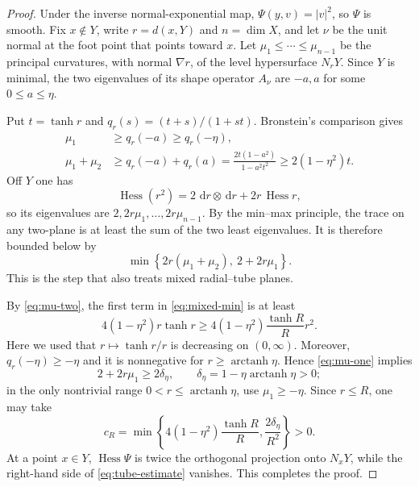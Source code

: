 \documentclass[12pt]{amsart}
\theoremstyle{remark}
\newcommand{\Hess}{\operatorname{Hess}}
\newcommand{\dd}{\,\mathrm d}
\begin{document}
\begin{proof}
Under the inverse normal-exponential map, $\Psi(y,v)=|v|^2$, so $\Psi$ is
smooth.  Fix $x\notin Y$, write $r=d(x,Y)$ and $n=\dim X$, and let $\nu$ be
the unit normal at the foot point that points toward $x$.  Let
$\mu_1\le\cdots\le\mu_{n-1}$ be the principal curvatures, with normal
$\nabla r$, of the level hypersurface $N_rY$.  Since $Y$ is minimal, the two
eigenvalues of its shape operator $A_\nu$ are $-a,a$ for some
$0\le a\le\eta$.

Put $t=\tanh r$ and $q_r(s)=(t+s)/(1+st)$.  Bronstein's comparison
\cite[Corollary~3.7]{BronsteinHadamard} gives
\begin{align}
 \mu_1&\ge q_r(-a)\ge q_r(-\eta),\label{eq:mu-one}\\
 \mu_1+\mu_2
 &\ge q_r(-a)+q_r(a)
 =\frac{2t(1-a^2)}{1-a^2t^2}
 \ge 2(1-\eta^2)t.\label{eq:mu-two}
\end{align}
Off $Y$ one has
\begin{equation}\label{eq:hessian-distance}
 \Hess(r^2)=2\,\dd r\otimes\dd r+2r\,\Hess r,
\end{equation}
so its eigenvalues are $2,2r\mu_1,\ldots,2r\mu_{n-1}$.  By the min--max
principle, the trace on any two-plane is at least the sum of the two least
eigenvalues.  It is therefore bounded below by
\begin{equation}\label{eq:mixed-min}
 \min\left\{2r(\mu_1+\mu_2),\ 2+2r\mu_1\right\}.
\end{equation}
This is the step that also treats mixed radial--tube planes.

By \eqref{eq:mu-two}, the first term in \eqref{eq:mixed-min} is at least
\[
 4(1-\eta^2)r\tanh r
 \ge 4(1-\eta^2)\frac{\tanh R}{R}r^2.
\]
Here we used that $r\mapsto\tanh r/r$ is decreasing on $(0,\infty)$.
Moreover, $q_r(-\eta)\ge-\eta$ and it is nonnegative for
$r\ge\operatorname{arctanh}\eta$.  Hence \eqref{eq:mu-one} implies
\[
 2+2r\mu_1\ge2\delta_\eta,
 \qquad
 \delta_\eta=1-\eta\operatorname{arctanh}\eta>0;
\]
in the only nontrivial range $0<r\le\operatorname{arctanh}\eta$, use
$\mu_1\ge-\eta$.  Since $r\le R$, one may take
\begin{equation}\label{eq:cR}
 c_R=\min\left\{
 4(1-\eta^2)\frac{\tanh R}{R},
 \frac{2\delta_\eta}{R^2}
 \right\}>0.
\end{equation}
At a point $x\in Y$, $\Hess\Psi$ is twice the orthogonal projection onto
$N_xY$, while the right-hand side of \eqref{eq:tube-estimate} vanishes.  This
completes the proof.
\end{proof}
\end{document}

